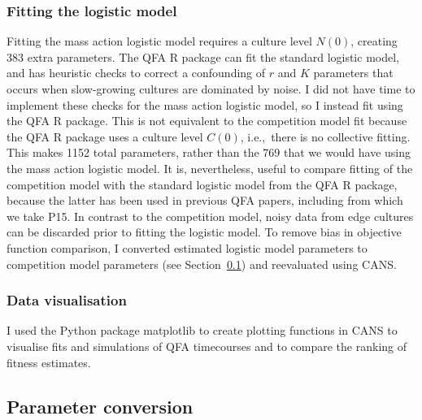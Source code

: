 \subsubsection{Fitting the logistic model}

Fitting the mass action logistic model requires a culture level
\(N(0)\), creating 383 extra parameters. The QFA R package
\citep{qfa2016} can fit the standard logistic model, and has heuristic
checks to correct a confounding of \(r\) and \(K\) parameters that
occurs when slow-growing cultures are dominated by noise. I did not
have time to implement these checks for the mass action logistic
model, so I instead fit using the QFA R package. This is not
equivalent to the competition model fit because the QFA R package uses
a culture level \(C(0)\), i.e.,~there is no collective fitting. This
makes 1152 total parameters, rather than the 769 that we would have
using the mass action logistic model. It is, nevertheless, useful to
compare fitting of the competition model with the standard logistic
model from the QFA R package, because the latter has been used in
previous QFA papers, including \citet{Addinall2011} from which we take
P15.
In contrast to the competition model, noisy data from edge cultures
can be discarded prior to fitting the logistic model. To remove bias
in objective function comparison, I converted estimated logistic model
parameters to competition model parameters (see
Section~\ref{sec:parameter_conversion}) and reevaluated using CANS.

\subsubsection{Data visualisation}

I used the Python package matplotlib to create plotting functions in
CANS to visualise fits and simulations of QFA timecourses and to
compare the ranking of fitness estimates.

\subsection{Parameter conversion}
\label{sec:parameter_conversion}

